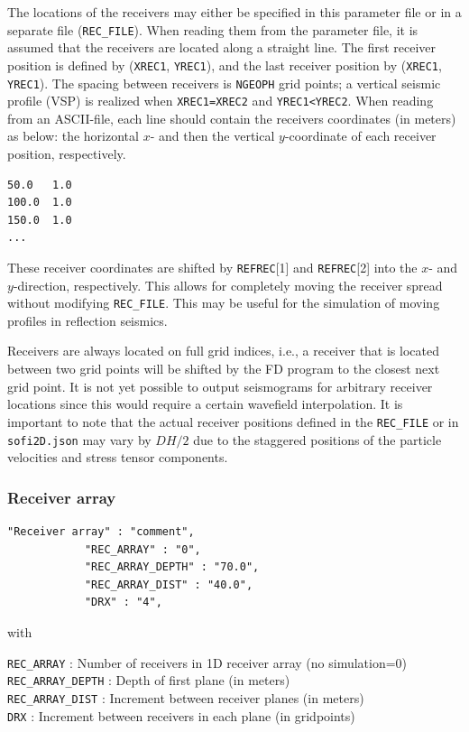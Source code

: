 The locations of the receivers may either be specified in this parameter file or in a separate file (\texttt{REC\_FILE}). When reading them from the parameter file, it is assumed that the receivers are located along a straight line. The first receiver position is defined by (\texttt{XREC1}, \texttt{YREC1}), and the last receiver position by (\texttt{XREC1}, \texttt{YREC1}). The spacing between receivers is \texttt{NGEOPH} grid points; a vertical seismic profile (VSP) is realized when \texttt{XREC1=XREC2} and \texttt{YREC1<YREC2}. When reading from an ASCII-file, each line should contain the receivers coordinates (in meters) as below: the horizontal $x$- and then the vertical $y$-coordinate of each receiver position, respectively.
\begin{verbatim}
50.0   1.0
100.0  1.0
150.0  1.0
...
\end{verbatim}

These receiver coordinates are shifted by \texttt{REFREC}[1] and \texttt{REFREC}[2] into the $x$- and $y$-direction, respectively. This allows for completely moving the receiver spread without modifying \texttt{REC\_FILE}. This may be useful for the simulation of moving profiles in reflection seismics.

Receivers are always located on full grid indices, i.e., a receiver that is located between two grid points will be shifted by the FD program to the closest next grid point. It is not yet possible to output seismograms for arbitrary receiver locations since this would require a certain wavefield interpolation. It is important to note that the actual receiver positions defined in the \texttt{REC\_FILE} or in \texttt{sofi2D.json} may vary by $DH/2$ due to the staggered positions of the particle velocities and stress tensor components.

\subsubsection{Receiver array}
\begin{verbatim}
"Receiver array" : "comment",
            "REC_ARRAY" : "0",
            "REC_ARRAY_DEPTH" : "70.0",
            "REC_ARRAY_DIST" : "40.0", 
            "DRX" : "4",
\end{verbatim}

with

\texttt{REC\_ARRAY} : Number of receivers in 1D receiver array (no simulation=0)\\
\texttt{REC\_ARRAY\_DEPTH} : Depth of first plane (in meters)\\
\texttt{REC\_ARRAY\_DIST} : Increment between receiver planes (in meters)\\
\texttt{DRX} : Increment between receivers in each plane (in gridpoints)

